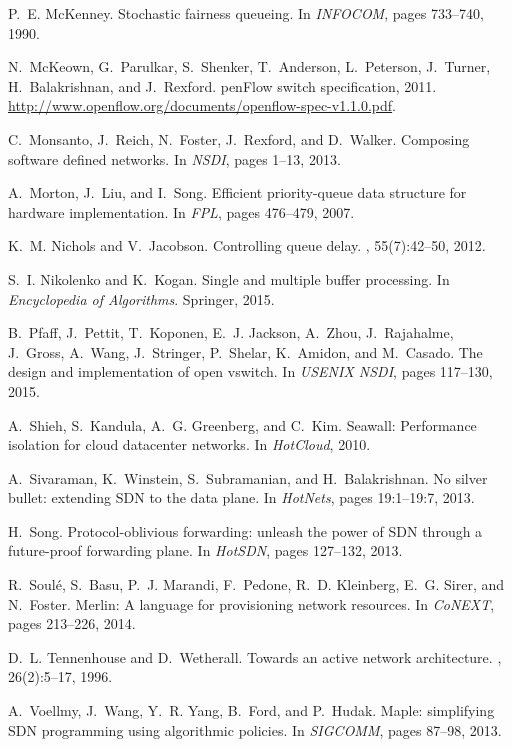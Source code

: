 \documentclass{article}
\begin{document}
\begin{thebibliography}{10}
P.~E. McKenney.
\newblock Stochastic fairness queueing.
\newblock In {\em {INFOCOM}}, pages 733--740, 1990.

N.~McKeown, G.~Parulkar, S.~Shenker, T.~Anderson, L.~Peterson, J.~Turner,
  H.~Balakrishnan, and J.~Rexford.
pen{F}low switch specification, 2011.
\newblock \url{http://www.openflow.org/documents/openflow-spec-v1.1.0.pdf}.

C.~Monsanto, J.~Reich, N.~Foster, J.~Rexford, and D.~Walker.
\newblock Composing software defined networks.
\newblock In {\em {NSDI}}, pages 1--13, 2013.

A.~Morton, J.~Liu, and I.~Song.
\newblock Efficient priority-queue data structure for hardware implementation.
\newblock In {\em {FPL}}, pages 476--479, 2007.

K.~M. Nichols and V.~Jacobson.
\newblock Controlling queue delay.
, 55(7):42--50, 2012.

S.~I. Nikolenko and K.~Kogan.
\newblock Single and multiple buffer processing.
\newblock In {\em Encyclopedia of Algorithms}. Springer, 2015.

B.~Pfaff, J.~Pettit, T.~Koponen, E.~J. Jackson, A.~Zhou, J.~Rajahalme,
  J.~Gross, A.~Wang, J.~Stringer, P.~Shelar, K.~Amidon, and M.~Casado.
\newblock The design and implementation of open vswitch.
\newblock In {\em {USENIX} {NSDI}}, pages 117--130, 2015.

A.~Shieh, S.~Kandula, A.~G. Greenberg, and C.~Kim.
\newblock Seawall: Performance isolation for cloud datacenter networks.
\newblock In {\em HotCloud}, 2010.

A.~Sivaraman, K.~Winstein, S.~Subramanian, and H.~Balakrishnan.
\newblock No silver bullet: extending {SDN} to the data plane.
\newblock In {\em {HotNets}}, pages 19:1--19:7, 2013.

H.~Song.
\newblock Protocol-oblivious forwarding: unleash the power of {SDN} through a
  future-proof forwarding plane.
\newblock In {\em {HotSDN}}, pages 127--132, 2013.

R.~Soul{\'{e}}, S.~Basu, P.~J. Marandi, F.~Pedone, R.~D. Kleinberg, E.~G.
  Sirer, and N.~Foster.
\newblock Merlin: {A} language for provisioning network resources.
\newblock In {\em CoNEXT}, pages 213--226, 2014.

D.~L. Tennenhouse and D.~Wetherall.
\newblock Towards an active network architecture.
, 26(2):5--17, 1996.

A.~Voellmy, J.~Wang, Y.~R. Yang, B.~Ford, and P.~Hudak.
\newblock Maple: simplifying {SDN} programming using algorithmic policies.
\newblock In {\em SIGCOMM}, pages 87--98, 2013.

\end{thebibliography}
\label{last-page}
\end{document}
